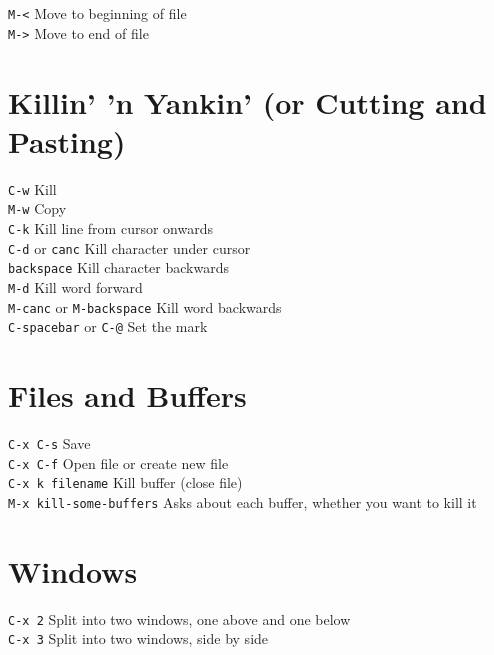 \documentclass[a4paper,12pt]{report}
\begin{document}
\texttt{M-<} Move to beginning of file \\

\texttt{M->} Move to end of file \\

\section{Killin' 'n Yankin' (or Cutting and Pasting)}

\texttt{C-w} Kill \\

\texttt{M-w} Copy \\

\texttt{C-k} Kill line from cursor onwards \\

\texttt{C-d} or \texttt{canc} Kill character under cursor \\

\texttt{backspace} Kill character backwards \\

\texttt{M-d} Kill word forward \\

\texttt{M-canc} or \texttt{M-backspace} Kill word backwards \\

\texttt{C-spacebar} or \texttt{C-@} Set the mark \\

\section{Files and Buffers}

\texttt{C-x C-s} Save \\

\texttt{C-x C-f} Open file or create new file \\

\texttt{C-x k filename} Kill buffer (close file)\\

\texttt{M-x kill-some-buffers} Asks about each buffer, whether you want to kill it


\section{Windows}

\texttt{C-x 2} Split into two windows, one above and one below \\

\texttt{C-x 3} Split into two windows, side by side \\
\end{document}

